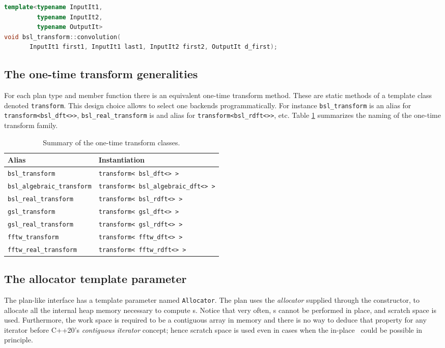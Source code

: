 \begin{lstlisting}[language=C++,caption=Convolution.,label=ls:convolution]
template<typename InputIt1,
         typename InputIt2,
         typename OutputIt>
void bsl_transform::convolution(
       InputIt1 first1, InputIt1 last1, InputIt2 first2, OutputIt d_first);
\end{lstlisting}

\subsection{The one-time transform generalities}
For each plan type and member function there is an equivalent one-time transform
method. These are static methods of a template class denoted \verb|transform|. 
This design choice allows to select one backends programmatically.
For instance \verb|bsl_transform| is an alias for \verb|transform<bsl_dft<>>|,
\verb|bsl_real_transform| is and alias for \verb|transform<bsl_rdft<>>|, etc.
Table \ref{tab:transform} summarizes the naming of the one-time transform family.
\begin{table}[h]
    \centering
    \begin{tabular}{ll}
        Alias & Instantiation \\
        \hline
        \verb|bsl_transform| & \verb|transform< bsl_dft<> >|\\
        \verb|bsl_algebraic_transform| & \verb|transform< bsl_algebraic_dft<> >|\\
        \verb|bsl_real_transform| & \verb|transform< bsl_rdft<> >|\\
        \verb|gsl_transform| & \verb|transform< gsl_dft<> >|\\
        \verb|gsl_real_transform| & \verb|transform< gsl_rdft<> >|\\
        \verb|fftw_transform| & \verb|transform< fftw_dft<> >|\\
        \verb|fftw_real_transform| & \verb|transform< fftw_rdft<> >|\\
    \end{tabular}
    \caption{Summary of the one-time transform classes.}
    \label{tab:transform}
\end{table}

\subsection{The allocator template parameter}
The plan-like interface has a template parameter named \verb|Allocator|.
The plan uses the \emph{allocator} supplied through the constructor, to allocate
all the internal heap memory necessary to compute \dft s.
Notice that very often, \dft s cannot be performed in place, and scratch space
is used. Furthermore, the work space is required to be a contiguous array in
memory and there is no way to deduce that property for any iterator before
C++20's \emph{contiguous iterator} concept; hence scratch space is used even in
cases when the in-place \dft\ could be possible in principle.

